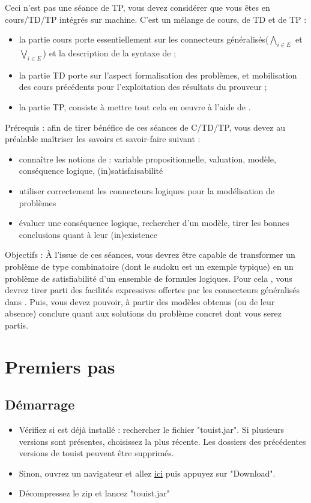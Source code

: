 
Ceci n'est pas une séance de TP, vous devez considérer que vous êtes en cours/TD/TP intégrés sur machine. C'est un mélange de cours, de TD et de TP :
\begin{itemize}
\item la partie cours porte essentiellement sur les connecteurs généralisés($\bigwedge_{i\in E}$ et $\bigvee_{i\in E}$) et la description de la syntaxe de \touist ; 
\item la partie TD porte sur l'aspect formalisation des problèmes, et mobilisation des cours précédents pour l'exploitation des résultats du prouveur ; 
\item la partie TP, consiste à mettre tout cela en oeuvre à l'aide de \touist. 
\end{itemize}

Prérequis : afin de tirer bénéfice de ces séances de C/TD/TP, vous devez au préalable maîtriser les savoirs et savoir-faire suivant : 
\begin{itemize}
\item connaître les notions de : variable propositionnelle, valuation, modèle, conséquence logique, (in)satisfaisabilité
\item utiliser correctement les connecteurs logiques pour la modélisation de problèmes
\item évaluer une conséquence logique, rechercher d'un modèle, tirer les bonnes conclusions quant à  leur (in)existence
\end{itemize}

Objectifs : 
À l'issue de ces séances, vous devrez être capable de transformer un problème de type combinatoire (dont le sudoku est un exemple typique) en un problème de satisfiabilité d'un ensemble de formules logiques. Pour cela , vous devrez tirer parti des facilités expressives offertes par les connecteurs généralisés dans \touist. Puis, vous devez pouvoir, à partir des modèles obtenus (ou de leur absence) conclure quant aux solutions du problème concret dont vous serez partis. 

\section{Premiers pas}
\subsection{Démarrage}
\begin{itemize}
\item Vérifiez si \touist est déjà installé : rechercher le fichier "touist.jar". Si plusieurs versions sont présentes, choisissez la plus récente. Les dossiers des précédentes versions de touist peuvent être supprimés.
\item Sinon, ouvrez un navigateur et allez \href{https://www.irit.fr/touist/}{ici} puis appuyez sur "Download".
\item Décompressez le zip et lancez "touist.jar"
\end{itemize}

